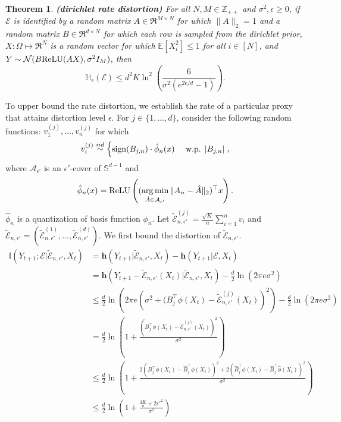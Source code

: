 \documentclass[twoside,11pt]{article}
\renewenvironment{proof}{\par\noindent{\bf Proof\ }}{\hfill\BlackBox\\[2mm]}
\newenvironment{proof}{\par\noindent{\bf Proof\ }}{\hfill\BlackBox\\[2mm]}
\newtheorem{theorem}{Theorem}
\def\environment{\mathcal{E}}
\def\proxy{\tilde{\environment}}
\def\normal{\mathcal{N}}
\def\diffentropy{\bf h}
\def\sign{{\rm sign}}
\def\relu{{\rm ReLU}}
\def\E{\mathbb{E}}
\def\H{\mathbb{H}}
\def\diffentropy{\mathbf{h}}
\def\I{\mathbb{I}}
\newcommand{\sphere}{\mathbb{S}^{d-1}}
\begin{document}
\begin{theorem}{\bf (dirichlet rate distortion)}
    For all $N, M\in\mathbb{Z}_{++}$ and $\sigma^2, \epsilon \geq 0$, if $\environment$ is identified by a random matrix $A\in\Re^{M\times N}$ for which $\|A\|_2 = 1$ and a random matrix $B\in\Re^{d\times N}$ for which each row is sampled from the dirichlet prior, $X:\Omega\mapsto\Re^N$ is a random vector for which $\E[X^2_i]\leq 1$ for all $i\in[N]$, and $Y\sim\normal(B\relu(AX), \sigma^2I_M)$, then
    $$\H_\epsilon(\environment) \leq d^2K\ln^2\left(\frac{6}{\sigma^2(e^{2\epsilon/d}-1)}\right).$$
\end{theorem}
\begin{proof}
    To upper bound the rate distortion, we establish the rate of a particular proxy that attains distortion level $\epsilon$. 
    For $j \in \{1, \ldots, d\}$, consider the following random functions: $v^{(j)}_1, \ldots, v^{(j)}_n$ for which
    $$v^{(j)}_i \overset{iid}{\sim}
    \begin{cases}
        \sign(B_{j,n})\cdot\hat{\phi}_n(x) & \text{ w.p. } |B_{j,n}|\\
    \end{cases},$$
    where $\mathcal{A}_{\epsilon'}$ is an $\epsilon'$-cover of $\sphere$ and 
    $$\hat{\phi}_n(x) = \relu\left((\argmin_{\hat{A}\in\mathcal{A}_{\epsilon'}}\|A_n-\hat{A}\|_2)^\top x\right).$$
    $\hat{\phi}_n$ is a quantization of basis function $\phi_n$. Let $\proxy^{(j)}_{n,\epsilon'} = \frac{\sqrt{K}}{n}\sum_{i=1}^{n} v_i$ and $\proxy_{n, \epsilon'} = (\proxy^{(1)}_{n,\epsilon'}, \ldots, \proxy^{(d)}_{n,\epsilon'})$. We first bound the distortion of $\proxy_{n, \epsilon'}$.
    \begin{align*}
        \I(Y_{t+1};\environment|\proxy_{n, \epsilon'}, X_t)
        & = \diffentropy(Y_{t+1}|\proxy_{n, \epsilon'}, X_t) - \diffentropy(Y_{t+1}|\environment, X_t)\\
        & = \diffentropy(Y_{t+1} - \proxy_{n, \epsilon'}(X_t)|\proxy_{n, \epsilon'}, X_t) - \frac{d}{2}\ln(2\pi e \sigma^2)\\
        & \leq \frac{d}{2}\ln\left(2\pi e\left(\sigma^2 + (B_j^\top\phi(X_t) - \proxy^{(j)}_{n,\epsilon'}(X_t)\right)^2\right)- \frac{d}{2}\ln(2\pi e \sigma^2)\\
        & = \frac{d}{2}\ln\left(1 + \frac{\left(B_j^\top \phi(X_t) - \proxy^{(j)}_{n, \epsilon'}(X_t)\right)^2}{\sigma^2}\right)\\
        & \leq \frac{d}{2}\ln\left(1 + \frac{2\left(B_j^\top \phi(X_t) - \hat{B}^\top_j\phi(X_t)\right)^2 + 2\left(\hat{B}^\top_j\phi(X_t) - \hat{B}^\top_j\hat{\phi}(X_t)\right)^2}{\sigma^2}\right)\\
        & \leq \frac{d}{2}\ln\left(1 + \frac{\frac{2K}{n} + 2\epsilon'^2}{\sigma^2}\right)
    \end{align*}
    

\end{proof}
\end{document}
